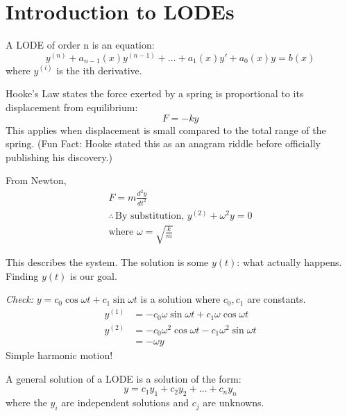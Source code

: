 \documentclass[../main.tex]{subfiles}
\begin{document}

\section{Introduction to LODEs}

\begin{definition}
    A LODE of order n is an equation:
    \[ y^{(n)}+a_{n-1}(x)y^{(n-1)}+\dots+a_{1}(x)y'+a_{0}(x)y=b(x)  \]
    where $y^{(i)}$ is the ith derivative.
\end{definition}

\begin{example}
    Hooke's Law states the force exerted by a spring is proportional to its displacement from equilibrium:
    \[ F = -ky \]
    This applies when displacement is small compared to the total range of the spring.
    (Fun Fact: Hooke stated this as an anagram riddle before officially publishing his discovery.)

    From Newton,
    \begin{gather*}
        F = m\frac{d^2y}{dt^2} \\
        \therefore \, \text{By substitution, } y^{(2)}+\omega^2y=0 \\
        \text{where } \omega =\sqrt{ \frac{k}{m} }
    \end{gather*}

    This describes the system. The solution is some \(y(t)\): what actually happens. Finding \(y(t)\) is our goal.

    \textit{Check:} \(y=c_{0}\cos \omega t+c_{1}\sin \omega t\) is a solution where \(c_{0},c_{1}\) are constants.
    \begin{align*}
        y^{(1)} & = -c_{0}\omega \sin \omega t+c_{1}\omega \cos \omega t \\
        y^{(2)} & = -c_{0}\omega^2\cos \omega t-c_{1}\omega^2\sin \omega t \\
        & = -\omega y
    \end{align*}
    Simple harmonic motion!
\end{example}

\begin{definition}
    A general solution of a LODE is a solution of the form:
    \[ y = c_{1}y_{1}+c_{2}y_{2}+\dots+c_{n}y_{n} \]
    where the \(y_{i}\) are independent solutions and \(c_{j}\) are unknowns.
\end{definition}
\end{document}
